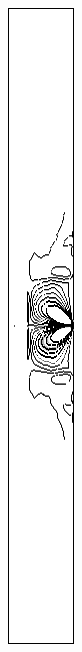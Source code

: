 \begin{figure}[h]
\begin{subfigure}[b]{0.13\textwidth}
\caption{ }
\end{subfigure}
\begin{subfigure}[b]{0.13\textwidth}
\centering
\includegraphics[width=\textwidth]{png/cranium/2d-sxy-single-comp-01.png}

\end{subfigure}
\end{figure}
